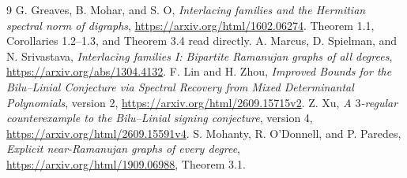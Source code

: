 \documentclass[11pt]{article}
\begin{document}
\begin{thebibliography}{9}
 G. Greaves, B. Mohar, and S. O,
\emph{Interlacing families and the Hermitian spectral norm of digraphs},
\url{https://arxiv.org/html/1602.06274}.
Theorem 1.1, Corollaries 1.2--1.3, and Theorem 3.4 read directly.
 A. Marcus, D. Spielman, and N. Srivastava,
\emph{Interlacing families I: Bipartite Ramanujan graphs of all degrees},
\url{https://arxiv.org/abs/1304.4132}.
 F. Lin and H. Zhou,
\emph{Improved Bounds for the Bilu--Linial Conjecture via Spectral Recovery
from Mixed Determinantal Polynomials}, version 2,
\url{https://arxiv.org/html/2609.15715v2}.
 Z. Xu,
\emph{A $3$-regular counterexample to the Bilu--Linial signing conjecture},
version 4, \url{https://arxiv.org/html/2609.15591v4}.
 S. Mohanty, R. O'Donnell, and P. Paredes,
\emph{Explicit near-Ramanujan graphs of every degree},
\url{https://arxiv.org/html/1909.06988}, Theorem 3.1.
\end{thebibliography}
\end{document}
